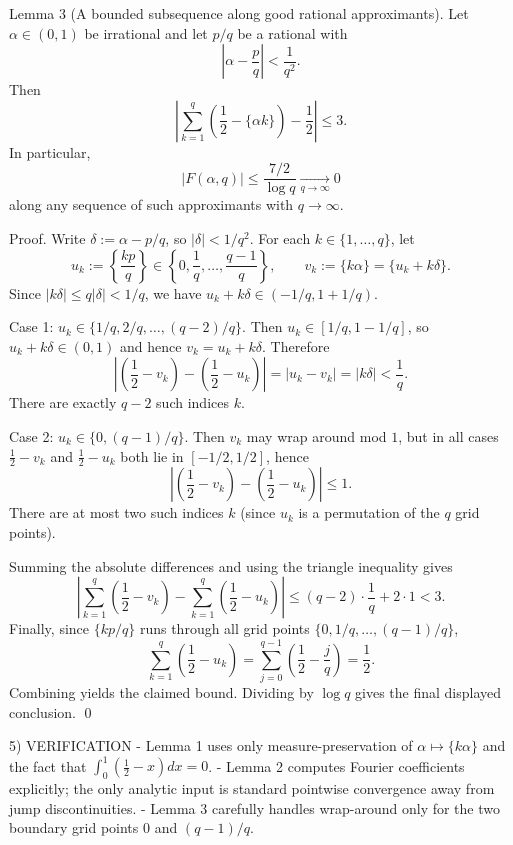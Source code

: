 Lemma 3 (A bounded subsequence along good rational approximants).
Let $\alpha\in(0,1)$ be irrational and let $p/q$ be a rational with
\[
\left|\alpha-\frac{p}{q}\right| < \frac{1}{q^2}.
\]
Then
\[
\left|\sum_{k=1}^q \left(\frac12-\{\alpha k\}\right) - \frac12\right| \le 3.
\]
In particular,
\[
|F(\alpha,q)| \le \frac{7/2}{\log q}\xrightarrow[q\to\infty]{}0
\]
along any sequence of such approximants with $q\to\infty$.

Proof.
Write $\delta:=\alpha-p/q$, so $|\delta|<1/q^2$.  For each $k\in\{1,\dots,q\}$, let
\[
 u_k:=\left\{\frac{kp}{q}\right\}\in\left\{0,\frac1q,\dots,\frac{q-1}{q}\right\},
\qquad
 v_k:=\{k\alpha\}=\{u_k + k\delta\}.
\]
Since $|k\delta|\le q|\delta|<1/q$, we have $u_k+k\delta\in(-1/q,1+1/q)$.

Case 1: $u_k\in\{1/q,2/q,\dots,(q-2)/q\}$.  Then $u_k\in[1/q,1-1/q]$, so $u_k+k\delta\in(0,1)$ and hence $v_k=u_k+k\delta$.  Therefore
\[
\left|\left(\frac12-v_k\right)-\left(\frac12-u_k\right)\right| = |u_k-v_k| = |k\delta| < \frac{1}{q}.
\]
There are exactly $q-2$ such indices $k$.

Case 2: $u_k\in\{0,(q-1)/q\}$.  Then $v_k$ may wrap around mod $1$, but in all cases $\frac12-v_k$ and $\frac12-u_k$ both lie in $[-1/2,1/2]$, hence
\[
\left|\left(\frac12-v_k\right)-\left(\frac12-u_k\right)\right|\le 1.
\]
There are at most two such indices $k$ (since $u_k$ is a permutation of the $q$ grid points).

Summing the absolute differences and using the triangle inequality gives
\[
\left|\sum_{k=1}^q \left(\frac12-v_k\right) - \sum_{k=1}^q \left(\frac12-u_k\right)\right|
\le (q-2)\cdot \frac{1}{q} + 2\cdot 1 < 3.
\]
Finally, since $\{kp/q\}$ runs through all grid points $\{0,1/q,\dots,(q-1)/q\}$,
\[
\sum_{k=1}^q \left(\frac12-u_k\right)=\sum_{j=0}^{q-1}\left(\frac12-\frac{j}{q}\right)=\frac12.
\]
Combining yields the claimed bound.  Dividing by $\log q$ gives the final displayed conclusion. \qed

5) VERIFICATION
- Lemma 1 uses only measure-preservation of $\alpha\mapsto\{k\alpha\}$ and the fact that $\int_0^1(\frac12-x)dx=0$.
- Lemma 2 computes Fourier coefficients explicitly; the only analytic input is standard pointwise convergence away from jump discontinuities.
- Lemma 3 carefully handles wrap-around only for the two boundary grid points $0$ and $(q-1)/q$.


